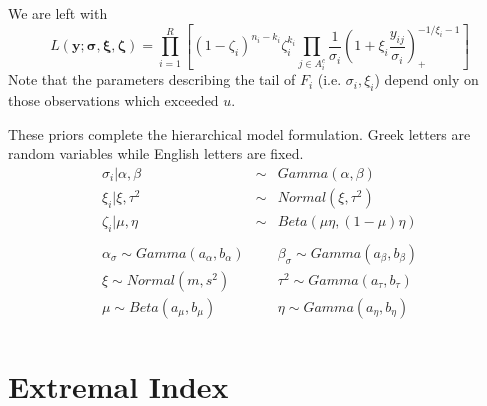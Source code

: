 \documentclass[12pt]{article}
\newcommand{\m}[1]{\mathbf{\bm{#1}}}
\newcommand{\m}[1]{\mathbf{\bm{#1}}}
\begin{document}
\noindent We are left with
\[ L(\m{y}; \m{\sigma}, \m{\xi}, \m{\zeta}) = \prod_{i=1}^R\left[(1-\zeta_i)^{n_i-k_i}\zeta_i^{k_i}\prod_{j\in A_i^c}\frac{1}{\sigma_i}\left(1+\xi_i\frac{y_{ij}}{\sigma_i}\right)_+^{-1/\xi_i-1}\right] \]
\noindent Note that the parameters describing the tail of $F_i$ (i.e. $\sigma_i,\xi_i$) depend only on those observations which exceeded $u$.



\noindent These priors complete the hierarchical model formulation. Greek letters are random variables while English letters are fixed.
\begin{eqnarray*}
\sigma_i|\alpha, \beta &\sim& Gamma(\alpha, \beta) \\
\xi_i|\xi, \tau^2  &\sim& Normal(\xi, \tau^2) \\
\zeta_i|\mu, \eta &\sim& Beta(\mu\eta, (1-\mu)\eta) \\
 \\
\alpha_\sigma \sim Gamma(a_\alpha, b_\alpha)&  &\beta_\sigma \sim Gamma(a_\beta, b_\beta) \\
\xi \sim Normal(m, s^2)&  &\tau^2 \sim Gamma(a_\tau, b_\tau) \\
\mu \sim Beta(a_\mu, b_\mu)&  &\eta \sim Gamma(a_\eta, b_\eta) \\
\end{eqnarray*}



\section{Extremal Index}
\label{index}
\end{document}
